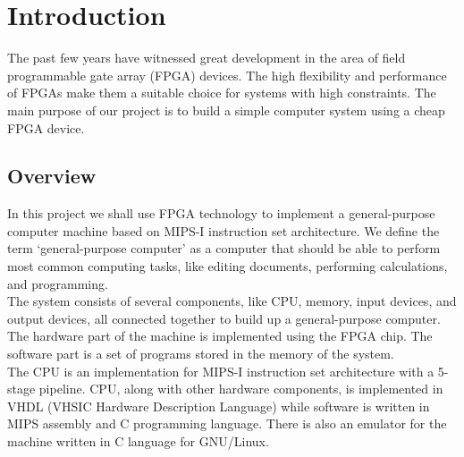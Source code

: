 \documentclass[oneside]{book}
\begin{document}

\newpage
\renewcommand{\contentsname}{Contents}
\tableofcontents


\newpage
\listoffigures


\mainmatter


{\let\clearpage\relax \chapter{Introduction}}

The past few years have witnessed great development in the area of
field programmable gate array (FPGA) devices. The high flexibility and
performance of FPGAs make them a suitable choice for systems with
high constraints. The main purpose of our project is to build a simple
computer system using a cheap FPGA device. \\

\section{Overview}

In this project we shall use FPGA technology to implement a general-purpose
computer machine based on MIPS-I instruction set architecture. We define the
term `general-purpose computer' as a computer that should be able to
perform most common computing tasks, like editing documents, performing
calculations, and programming.\\

The system consists of several components, like CPU, memory, input devices,
and output devices, all connected together to build up a general-purpose
computer. The hardware part of the machine is implemented using the FPGA
chip. The software part is a set of programs stored in the memory of
the system.\\

The CPU is an implementation for MIPS-I instruction set architecture with
a 5-stage pipeline. CPU, along with other hardware components, is implemented
in VHDL (VHSIC Hardware Description Language) while software is written
in MIPS assembly and C programming language. There is also an emulator
for the machine written in C language for GNU/Linux.\\
\end{document}
